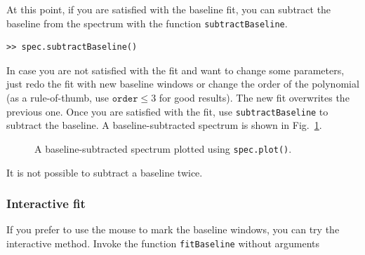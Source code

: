 \documentclass[11pt,a4paper]{article}
\begin{document}
At this point, if you are satisfied with the baseline fit, you can
subtract the baseline from the spectrum with the function
\texttt{subtractBaseline}.
\begin{lstlisting}
>> spec.subtractBaseline()
\end{lstlisting}
In case you are not satisfied with the fit and want to change some
parameters, just redo the fit with new baseline windows or change the
order of the polynomial (as a rule-of-thumb, use $\mathtt{order}\leq3$
for good results). The new fit overwrites the previous one. Once you
are satisfied with the fit, use \texttt{subtractBaseline} to subtract
the baseline. A baseline-subtracted spectrum is shown in
Fig.~\ref{fig:baseline-subtracted}.
\begin{figure}[h!]
  \centering
  \caption{A baseline-subtracted spectrum plotted using
    \texttt{spec.plot()}.}
\label{fig:baseline-subtracted}
\end{figure}

It is not possible to subtract a baseline twice. 

\subsubsection{Interactive fit}
\label{sec:interactive-fit}

If you prefer to use the mouse to mark the baseline windows, you can
try the interactive method. Invoke the function
\texttt{fitBaseline} without arguments
\end{document}
